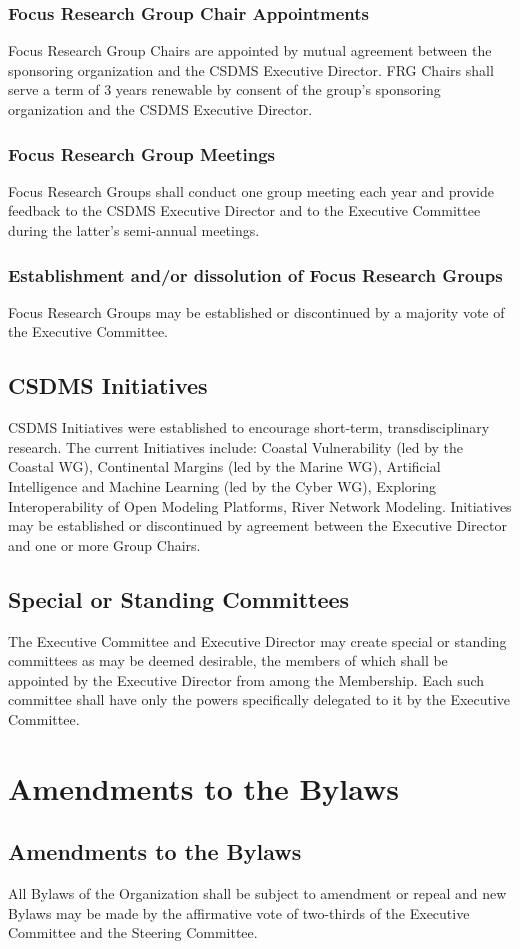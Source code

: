 \documentclass[11pt, oneside]{article}   	%
\def\article#1{
\renewcommand{\thesection}{Article \Roman{section}} 
\section[Article]{#1}
\renewcommand{\thesection}{\Roman{section}} 
}
\begin{document}
\subsubsection{Focus Research Group Chair Appointments}
Focus Research Group Chairs are appointed by mutual agreement between the sponsoring organization and the CSDMS Executive Director. FRG Chairs shall serve a term of 3 years renewable by consent of the group's sponsoring organization and the CSDMS Executive Director.

\subsubsection{Focus Research Group Meetings}

Focus Research Groups shall conduct one group meeting each year and provide feedback to the CSDMS Executive Director and to the Executive Committee during the latter's semi-annual meetings.

\subsubsection{Establishment and/or dissolution of Focus Research Groups}

Focus Research Groups may be established or discontinued by a majority vote of the Executive Committee.  


\subsection{CSDMS Initiatives}

CSDMS Initiatives were established to encourage short-term, transdisciplinary research. The current Initiatives include: Coastal Vulnerability (led by the Coastal WG), Continental Margins (led by the Marine WG), Artificial Intelligence and Machine Learning (led by the Cyber WG), Exploring Interoperability of Open Modeling Platforms, River Network Modeling.  Initiatives may be established or discontinued by agreement between the Executive Director and one or more Group Chairs.


\subsection{Special or Standing Committees}

The Executive Committee and Executive Director may create special or standing committees as may be deemed desirable, the members of which shall be appointed by the Executive Director from among the Membership.  Each such committee shall have only the powers specifically delegated to it by the Executive Committee.




\article{Amendments to the Bylaws}

\subsection{Amendments to the Bylaws}

All Bylaws of the Organization shall be subject to amendment or repeal and new Bylaws may be made by the affirmative vote of two-thirds of the Executive Committee and the Steering Committee.
\end{document}
